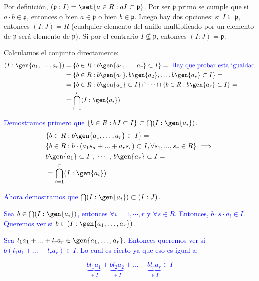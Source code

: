 \begin{problem}
Por definición, $(\mathfrak{p}: I) = \set{ a \in R: a I \subset \mathfrak{p} }$. Por ser $\mathfrak{p}$ primo se cumple que si $a·b ∈ \mathfrak{p}$, entonces o bien $a ∈ \mathfrak{p}$ o bien $b ∈ \mathfrak{p}$. Luego hay dos opciones: si $I ⊆ \mathfrak{p}$, entonces $(I:J) = R$ (cualquier elemento del anillo multiplicado por un elemento de $\mathfrak{p}$ será elemento de $\mathfrak{p}$). Si por el contrario $I \nsubseteq \mathfrak{p}$, entonces $(I:J) = \mathfrak{p}$.

\spart

Calculamos el conjunto directamente:
\begin{align*}
	(I:\gen{a_1,\ldots, a_r})
	&= \{ b\in R \tq b \gen{a_1,\ldots, a_r} \subset I \} = \textcolor{blue}{\text{ Hay que probar esta igualdad} }  \\
	&= \{ b\in R \tq b\gen{a_1}, b\gen{a_2},\dotsc ,b\gen{a_r} \subset I \} = \\
	&= \{ b\in R \tq b\gen{a_1} \subset I\} \cap \dotsb \cap \{ b\in R \tq b\gen{a_r} \subset I\} =  \\
	&= \bigcap_{i=1}^r (I: \gen{a_i})
\end{align*}

\textcolor{blue}{
	Demostramos primero que $\{ b \in R: bJ \subset I \} \subset \bigcap (I:\gen{a_i})$.
	\begin{align*}
		& \{ b\in R \tq b \gen{a_1,\ldots, a_r} \subset I \} = \\
		& \{ b\in R \tq b \cdot(a_1s_a+...+a_rs_r) \subset I, \forall s_1,...,s_r \in R \} \implies \\
		&  b\gen{a_1} \subset I \text{ , } \dotsb \text{ , } b\gen{a_r} \subset I =  \\
		&= \bigcap_{i=1}^r (I: \gen{a_i})
	\end{align*}
	}

	\textcolor{blue}{Ahora demostramos que $\bigcap (I:\gen{a_i}) \subset (I:J) $.}

	\textcolor{blue}{Sea $b \in \bigcap (I:\gen{a_i})$, entonces $\forall i=1,\cdots,r$ y $\forall s \in R$. Entonces, $b\cdot s\cdot a_i \in I$. Queremos ver si $b \in (I:\gen{a_1,\ldots, a_r})$.}

	\textcolor{blue}{Sea $l_1a_1+...+l_ra_r \in \gen{a_1,\ldots, a_r}$. Entonces queremos ver si $b(l_1a_1+...+l_ra_r) \in I$. Lo cual es cierto ya que eso es igual a:}

	\textcolor{blue}{$$ \underbrace{bl_1a_1}_{\in I}+\underbrace{bl_2a_2}_{\in I}+...+\underbrace{bl_ra_r}_{\in I} \in I $$}


\end{problem}


